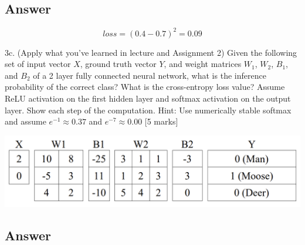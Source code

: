 \documentclass[
	12pt, %
]{fphw}
\begin{document}
\subsection*{Answer}
\begin{equation}
	loss = (0.4-0.7)^2 = 0.09
\end{equation}
\begin{problem}
3c. (Apply what you’ve learned in lecture and Assignment 2) Given the following set of
input vector $X$, ground truth vector $Y$, and weight matrices $W_1$, $W_2$, $B_1$, and $B_2$ of a 2
layer fully connected neural network, what is the inference probability of the correct
class? What is the cross-entropy loss value? Assume ReLU activation on the first hidden
layer and softmax activation on the output layer. Show each step of the computation.
Hint: Use numerically stable softmax and assume $e^{-1} \approx 0.37$ and $e^{-7}\approx 0.00$ [5
		marks]
\begin{center}
	\includegraphics[width=0.75\columnwidth, page=1]{3c.png} %
\end{center}
\end{problem}
\subsection*{Answer}
\end{document}
